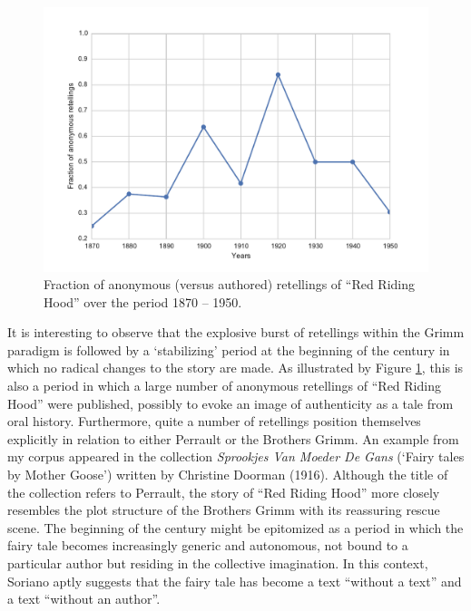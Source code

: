 \begin{figure}
\centering
\includegraphics[width=\textwidth]{images/anonymous}
\caption{Fraction of anonymous (versus authored) retellings of ``Red Riding Hood'' over the period 1870 -- 1950.}
\label{fig:anonymous}
\end{figure}

It is interesting to observe that the explosive burst of retellings within the Grimm paradigm is followed by a `stabilizing' period at the beginning of the  century in which no radical changes to the story are made. As illustrated by Figure \ref{fig:anonymous}, this is also a period in which a large number of anonymous retellings of ``Red Riding Hood'' were published, possibly to evoke an image of authenticity as a tale from oral history. Furthermore, quite a number of retellings position themselves explicitly in relation to either Perrault or the Brothers Grimm. An example from my corpus appeared in the collection \emph{Sprookjes Van Moeder De Gans} (`Fairy tales by Mother Goose') written by Christine Doorman (1916). Although the title of the collection refers to Perrault, the story of ``Red Riding Hood'' more closely resembles the plot structure of the Brothers Grimm with its reassuring rescue scene. The beginning of the  century might be epitomized as a period in which the fairy tale becomes increasingly generic and autonomous, not bound to a particular author but residing in the collective imagination. In this context, Soriano aptly suggests that the fairy tale has become a text ``without a text'' and a text ``without an author''\autocite[cited in][xvii]{beckett:2002}.

